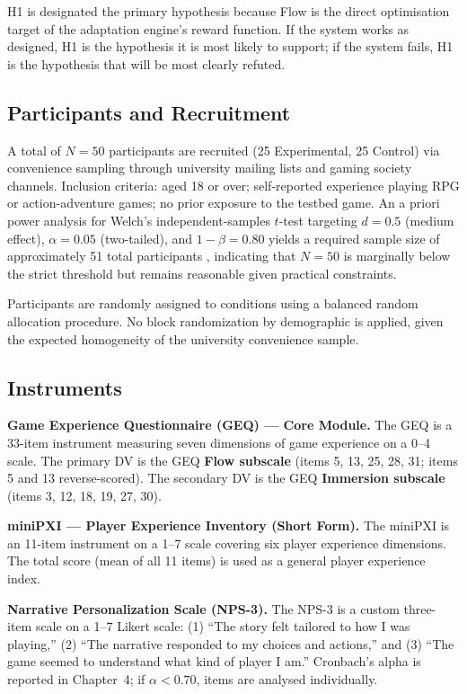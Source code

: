 H1 is designated the primary hypothesis because Flow is the direct optimisation target of the adaptation engine's reward function. If the system works as designed, H1 is the hypothesis it is most likely to support; if the system fails, H1 is the hypothesis that will be most clearly refuted.

\subsection{Participants and Recruitment}

A total of $N = 50$ participants are recruited (25 Experimental, 25 Control) via convenience sampling through university mailing lists and gaming society channels. Inclusion criteria: aged 18 or over; self-reported experience playing RPG or action-adventure games; no prior exposure to the testbed game. An a priori power analysis for Welch's independent-samples $t$-test targeting $d = 0.5$ (medium effect), $\alpha = 0.05$ (two-tailed), and $1 - \beta = 0.80$ yields a required sample size of approximately 51 total participants \citep{faul2007gpower}, indicating that $N = 50$ is marginally below the strict threshold but remains reasonable given practical constraints.

Participants are randomly assigned to conditions using a balanced random allocation procedure. No block randomization by demographic is applied, given the expected homogeneity of the university convenience sample.

\subsection{Instruments}

\textbf{Game Experience Questionnaire (GEQ) --- Core Module.} The GEQ \citep{ijsselsteijn2013geq} is a 33-item instrument measuring seven dimensions of game experience on a 0--4 scale. The primary DV is the GEQ \textbf{Flow subscale} (items 5, 13, 25, 28, 31; items 5 and 13 reverse-scored). The secondary DV is the GEQ \textbf{Immersion subscale} (items 3, 12, 18, 19, 27, 30).

\textbf{miniPXI --- Player Experience Inventory (Short Form).} The miniPXI \citep{vornhagen2022minipxi} is an 11-item instrument on a 1--7 scale covering six player experience dimensions. The total score (mean of all 11 items) is used as a general player experience index.

\textbf{Narrative Personalization Scale (NPS-3).} The NPS-3 is a custom three-item scale on a 1--7 Likert scale: (1) ``The story felt tailored to how I was playing,'' (2) ``The narrative responded to my choices and actions,'' and (3) ``The game seemed to understand what kind of player I am.'' Cronbach's alpha is reported in Chapter~4; if $\alpha < 0.70$, items are analysed individually.

